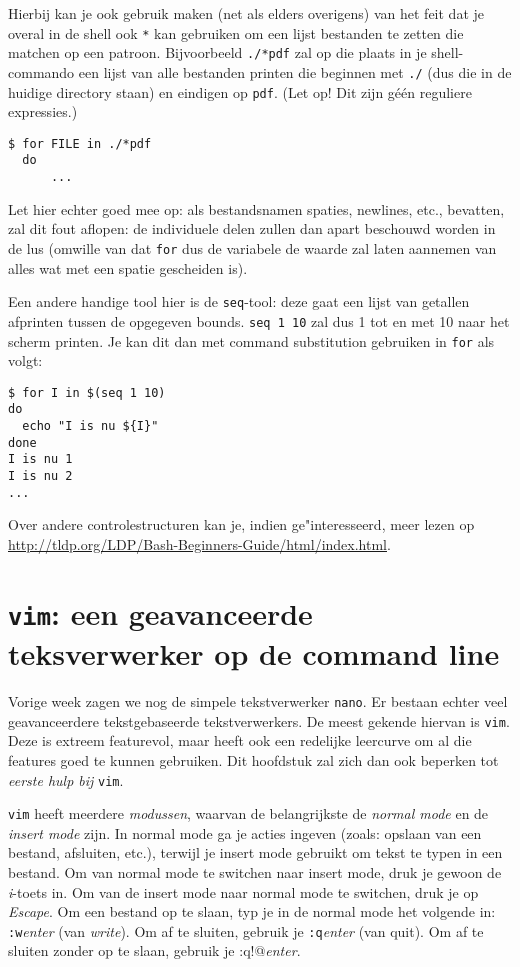 \documentclass[a4paper,twoside,openany]{memoir}
\begin{document}
Hierbij kan je ook gebruik maken (net als elders overigens) van het feit dat je
overal in de shell ook \verb!*! kan gebruiken om een lijst bestanden te zetten
die matchen op een patroon. Bijvoorbeeld \verb!./*pdf! zal op die plaats in je
shell-commando een lijst van alle bestanden printen die beginnen met \verb!./!
(dus die in de huidige directory staan) en eindigen op \verb!pdf!. (Let op! Dit
zijn g\'e\'en reguliere expressies.)
\begin{verbatim}
$ for FILE in ./*pdf
  do
      ...
\end{verbatim}

Let hier echter goed mee op: als bestandsnamen spaties, newlines, etc.,
bevatten, zal dit fout aflopen: de individuele delen zullen dan apart beschouwd
worden in de lus (omwille van dat \verb!for! dus de variabele de waarde zal
laten aannemen van alles wat met een spatie gescheiden is).

Een andere handige tool hier is de \verb!seq!-tool: deze gaat een lijst van
getallen afprinten tussen de opgegeven bounds. \verb!seq 1 10! zal dus 1 tot en
met 10 naar het scherm printen. Je kan dit dan met command substitution
gebruiken in \verb!for! als volgt:

\begin{verbatim}
$ for I in $(seq 1 10)
do
  echo "I is nu ${I}"
done
I is nu 1
I is nu 2
...
\end{verbatim}

Over andere controlestructuren kan je, indien ge"interesseerd, meer lezen op
\url{http://tldp.org/LDP/Bash-Beginners-Guide/html/index.html}.

\chapter{\texttt{vim}: een geavanceerde teksverwerker op de command line}

Vorige week zagen we nog de simpele tekstverwerker \verb!nano!. Er bestaan
echter veel geavanceerdere tekstgebaseerde tekstverwerkers. De meest gekende
hiervan is \verb!vim!. Deze is extreem featurevol, maar heeft ook een redelijke
leercurve om al die features goed te kunnen gebruiken. Dit hoofdstuk zal zich
dan ook beperken tot \emph{eerste hulp bij} \verb!vim!.

\verb!vim! heeft meerdere \emph{modussen}, waarvan de belangrijkste de
\emph{normal mode} en de \emph{insert mode} zijn. In normal mode ga je acties
ingeven (zoals: opslaan van een bestand, afsluiten, etc.), terwijl je insert
mode gebruikt om tekst te typen in een bestand. Om van normal mode te switchen
naar insert mode, druk je gewoon de \emph{i}-toets in. Om van de insert mode
naar normal mode te switchen, druk je op \emph{Escape}. Om een bestand op te
slaan, typ je in de normal mode het volgende in: \verb!:w!\emph{enter} (van
\emph{write}). Om af te sluiten, gebruik je \verb!:q!\emph{enter} (van quit).
Om af te sluiten zonder op te slaan, gebruik je \verb@:q!@\emph{enter}.
\end{document}
